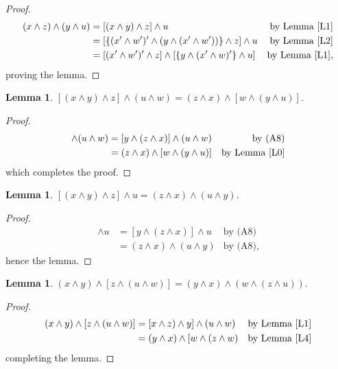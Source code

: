 \documentclass{amsart}
\theoremstyle{plain}
\newtheorem{lemma}[theorem]{Lemma}
\theoremstyle{problem}
\theoremstyle{definition}
\theoremstyle{remark}
\numberwithin{equation}{section}
\begin{document}
\begin{proof}
\begin{align*}
 (x \land z) \land (y \land u) &= [(x \land y) \land z] \land u &\text{by Lemma \ref{L1}}\\ 
                                                   &= [\{(x' \land w')' \land (y \land (x' \land w'))\} \land z] \land u  &\text{by Lemma \ref{L2}}\\ 
                                                    &= [(x' \land w')' \land z] \land [\{y \land (x' \land w)'\} \land u] &\text{by Lemma \ref{L1}},   
\end{align*}
proving the lemma.
\end{proof}


\begin{lemma} \label{L4} 
 $[(x \land y) \land z] \land (u \land w) = (z \land x) \land [w \land (y \land u)].$ 
\end{lemma}

\begin{proof}
\begin{align*}   
[(x \land y) \land z)] \land (u \land w) &=  [y \land (z \land x)] \land (u \land w) &\text{by (A8)}\\
                                                          &= (z \land x) \land [w \land (y \land u)] &\text{by Lemma \ref{L0}} 
\end{align*}
which completes the proof.
\end{proof}

\begin{lemma} \label{L5} 
$[(x \land y) \land z] \land u = (z \land x) \land (u \land y).$ 
\end{lemma}

\begin{proof}
\begin{align*}   
[(x \land y) \land z] \land u &= [y \land (z \land x)] \land u  &\text{by (A8)}\\     
                                          &= (z \land x) \land (u \land y) &\text{by (A8)},    
\end{align*}
hence the lemma.
\end{proof}

                                    
\begin{lemma} \label{L6} 
 $(x \land y) \land [z \land (u \land w)] = (y \land x) \land (w \land (z \land u)).$  
\end{lemma}

\begin{proof}
\begin{align*}
(x \land y) \land [z \land (u \land w)] &=  [x \land z) \land y] \land (u \land w) &\text{by Lemma \ref{L1}}\\ \ 
                                                         &= (y \land x) \land [w \land (z \land w)  &\text{by Lemma \ref{L4}}                 
\end{align*}
completing the lemma.
\end{proof}
\end{document}
